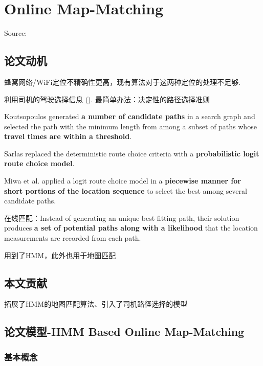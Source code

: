 \chapter{Online Map-Matching}

Source: \cite{Jagadeesh2017}

\section{论文动机}
    蜂窝网络/WiFi定位不精确性更高，现有算法对于这两种定位的处理不足够. 
    
利用司机的驾驶选择信息 ().
最简单办法：决定性的路径选择准则

\begin{example}
    Koutsopoulos generated \textbf{a number of candidate paths} in a
search graph and selected the path with the minimum length
from among a subset of paths whose \textbf{travel times are within
a threshold}.

Sarlas replaced the deterministic route choice criteria with a
\textbf{probabilistic logit route choice model}.

Miwa et al. applied a logit route choice model in
a \textbf{piecewise manner for short portions of the location sequence}
to select the best among several candidate paths.
\end{example}

在线匹配：Instead of generating an unique best
fitting path, their solution produces \textbf{a set of potential paths
along with a likelihood} that the location measurements are
recorded from each path.

\cite{newson2009hidden} 用到了HMM，此外也用于地图匹配

\section{本文贡献}

拓展了HMM的地图匹配算法、引入了司机路径选择的模型

\section{论文模型-HMM Based Online Map-Matching}

\subsection{基本概念}

